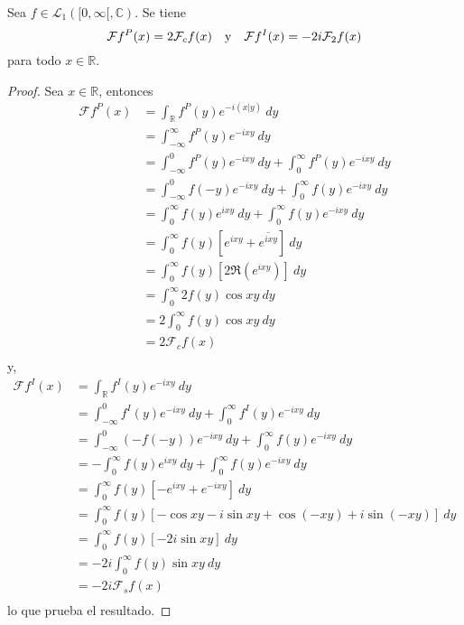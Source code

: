 \documentclass[12pt]{report}
\theoremstyle{largebreak}
\newcommand\pint[2]{\ensuremath{\left(#1\big| #2\right)}}
\newcommand\conj[1]{\ensuremath{\overline{#1}}}
\newcommand{\fou}[1]{\ensuremath{\mathcal{F}#1}}
\begin{document}
    \begin{propo}
        Sea $f\in\mathcal{L}_1([0,\infty[,\mathbb{C})$. Se tiene
        \begin{equation*}
            \fou{f^P}(x)=2\mathcal{F}_cf(x)\quad\textup{y}\quad\fou{f^I}(x)=-2i\mathcal{F}_2f(x)
        \end{equation*}
        para todo $x\in\mathbb{R}$.
    \end{propo}

    \begin{proof}
        Sea $x\in\mathbb{R}$, entonces
        \begin{equation*}
            \begin{split}
                \fou{f^P}(x)&=\int_{\mathbb{R}} f^P(y) e^{ -i\pint{x}{y}} \:dy\\
                &=\int_{-\infty}^\infty f^P(y)e^{-ixy}\:dy\\
                &=\int_{-\infty}^0f^P(y)e^{-ixy}\:dy+\int_0^{\infty}f^P(y)e^{-ixy}\:dy \\
                &=\int_{-\infty}^0f(-y)e^{-ixy}\:dy+\int_0^{\infty}f(y)e^{-ixy}\:dy\\
                &=\int_{0}^\infty f(y)e^{ixy}\:dy+\int_0^{\infty}f(y)e^{-ixy}\:dy\\
                &=\int_{0}^\infty f(y)\left[e^{ixy}+\conj{e^{ixy}}\right] \:dy\\
                &=\int_{0}^\infty f(y)\left[2\Re(e^{ ixy}) \right] \:dy\\
                &=\int_{0}^\infty 2f(y)\cos xy \:dy\\
                &=2\int_{0}^\infty f(y)\cos xy \:dy\\
                &=2\mathcal{F}_cf(x)\\
            \end{split}
        \end{equation*}
        y,
        \begin{equation*}
            \begin{split}
                \fou{f^I}(x)&=\int_{\mathbb{R}}f^I(y)e^{ -ixy}\:dy\\
                &=\int_{-\infty}^0f^I(y)e^{ -ixy}\:dy+\int_{0}^\infty f^I(y)e^{ -ixy}\:dy\\
                &=\int_{-\infty}^0(-f(-y))e^{ -ixy}\:dy+\int_{0}^\infty f(y)e^{ -ixy}\:dy\\
                &=-\int_{0}^\infty f(y)e^{ixy}\:dy+\int_{0}^\infty f(y)e^{ -ixy}\:dy\\
                &=\int_{0}^\infty f(y)\left[-e^{ixy}+e^{-ixy}\right] \:dy\\
                &=\int_{0}^\infty f(y)\left[-\cos xy-i\sin xy+\cos(-xy)+i\sin(-xy)\right] \:dy\\
                &=\int_{0}^\infty f(y)\left[-2i\sin xy\right]\:dy\\
                &=-2i\int_{0}^\infty f(y)\sin xy\:dy\\
                &=-2i\mathcal{F}_sf(x)\\
            \end{split}
        \end{equation*}
        lo que prueba el resultado.
    \end{proof}
\end{document}
